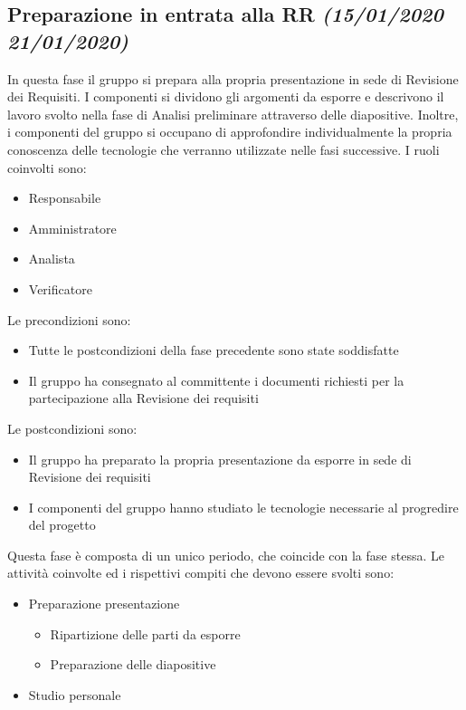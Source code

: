 \documentclass[../piano-di-progetto.tex]{subfiles}
\begin{document}
\subsection[Preparazione in entrata alla RR]{Preparazione in entrata alla RR {\normalsize\normalfont\itshape(15/01/2020  21/01/2020)}}%
\label{sub:preparazione_in_entrata_alla_rr}
In questa fase il gruppo si prepara alla propria presentazione in sede di Revisione dei Requisiti.
I componenti si dividono gli argomenti da esporre e descrivono il lavoro svolto nella fase di Analisi preliminare attraverso delle diapositive.
Inoltre, i componenti del gruppo si occupano di approfondire individualmente la propria conoscenza delle tecnologie che verranno utilizzate nelle fasi successive.
I ruoli coinvolti sono:
\begin{itemize}
  \item Responsabile
  \item Amministratore
  \item Analista
  \item Verificatore
\end{itemize}
Le precondizioni sono:
\begin{itemize}
  \item Tutte le postcondizioni della fase precedente sono state soddisfatte
  \item Il gruppo ha consegnato al committente i documenti richiesti per la partecipazione alla Revisione dei requisiti
\end{itemize}
Le postcondizioni sono:
\begin{itemize}
  \item Il gruppo ha preparato la propria presentazione da esporre in sede di Revisione dei requisiti
  \item I componenti del gruppo hanno studiato le tecnologie necessarie al progredire del progetto
\end{itemize}
Questa fase è composta di un unico periodo, che coincide con la fase stessa.
Le attività coinvolte ed i rispettivi compiti che devono essere svolti sono:
\begin{itemize}
  \item Preparazione presentazione
  \begin{itemize}
    \item Ripartizione delle parti da esporre
    \item Preparazione delle diapositive
  \end{itemize}
  \item Studio personale 
\end{itemize}
\end{document}
